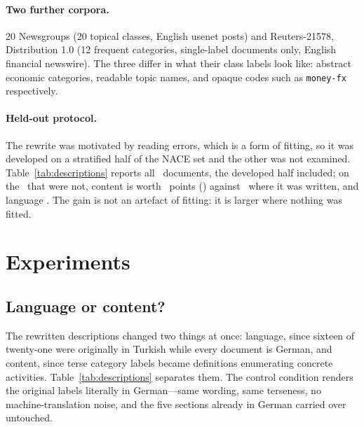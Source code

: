 \documentclass[11pt]{article}
\begin{document}
\paragraph{Two further corpora.}
20 Newsgroups \citep{lang-1995-newsweeder} (20 topical classes, English usenet
posts) and Reuters-21578, Distribution 1.0 \citep{lewis-1987-reuters} (12
frequent categories, single-label documents only, English financial newswire).
The three differ in what their class labels look like: abstract economic
categories, readable topic names, and opaque codes such as \texttt{money-fx}
respectively.

\paragraph{Held-out protocol.}
The rewrite was motivated by reading errors, which is a form of fitting, so it
was developed on a stratified half of the NACE set and the other was not
examined. Table~\ref{tab:descriptions} reports all \NEVAL\ documents, the
developed half included; on the \HeldOutN\ that were not, content is worth
\HeldOutContentEffect~points (\HeldOutContentPStat) against
\DevContentEffect\ where it was written, and language
\HeldOutLanguageEffect. The gain is not an artefact of fitting: it is larger
where nothing was fitted.

\section{Experiments}

\subsection{Language or content?}
\label{sec:descriptions}



The rewritten descriptions changed two things at once: language, since sixteen
of twenty-one were originally in Turkish while every document is German, and
content, since terse category labels became definitions enumerating concrete
activities. Table~\ref{tab:descriptions} separates them. The control condition
renders the original labels literally in German---same wording, same terseness, no
machine-translation noise, and the five sections already in German carried over
untouched.
\end{document}
